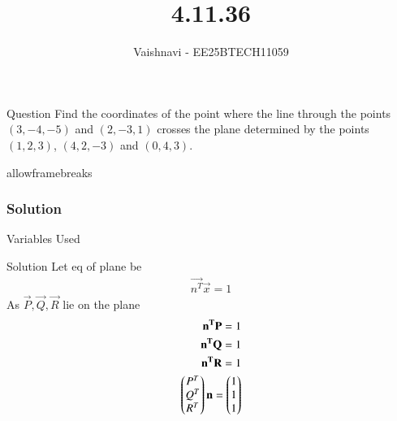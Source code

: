 \documentclass{beamer}
\title %
{4.11.36}
\author %
{Vaishnavi - EE25BTECH11059}
\begin{document}
\frame{\titlepage}
\begin{frame}{Question}
Find the coordinates of the point where the line through the points $(3, -4, -5)$ and $(2, -3, 1)$ crosses the plane determined by the points $(1, 2, 3)$, $(4, 2, -3)$ and $(0, 4, 3)$.
\end{frame}
\begin{frame}{allowframebreaks}
\frametitle{Solution}
\begin{table}[H]    
  \centering
  
  \caption{Variables Used}
  \label{tab:1.10.2}
\end{table}

\end{frame}


\begin{frame}{Solution}
Let eq of plane be
\begin{align}
    \vec{n^T}\vec{x}=1
\end{align}
As $\vec{P},\vec{Q},\vec{R}$ lie on the plane
\begin{align}
 \mathbf{n^T}\mathbf{P}=1\\
  \mathbf{n^T}\mathbf{Q}=1\\
  \mathbf{n^T}\mathbf{R}=1\\
   \begin{pmatrix}P^T 
        \\
        Q^T
        \\
        R^T\end{pmatrix}
\mathbf{n}
=
\begin{pmatrix}1
       \\
       1
       \\
       1\end{pmatrix}
 \end{align}
\end{frame}
\end{document}
